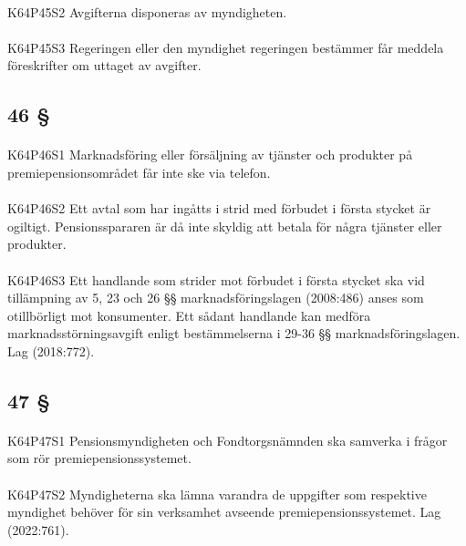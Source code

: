 \documentclass[a4paper,notitlepage,openany,10pt]{book}
\begin{document}
\paragraph*{}
{\tiny K64P45S2}
Avgifterna disponeras av myndigheten.
\paragraph*{}
{\tiny K64P45S3}
Regeringen eller den myndighet regeringen bestämmer får meddela föreskrifter om uttaget av avgifter.
\subsection*{46 §}
\paragraph*{}
{\tiny K64P46S1}
Marknadsföring eller försäljning av tjänster och produkter på premiepensionsområdet får inte ske via telefon.
\paragraph*{}
{\tiny K64P46S2}
Ett avtal som har ingåtts i strid med förbudet i första stycket är ogiltigt. Pensionsspararen är då inte skyldig att betala för några tjänster eller produkter.
\paragraph*{}
{\tiny K64P46S3}
Ett handlande som strider mot förbudet i första stycket ska vid tillämpning av 5, 23 och 26 §§ marknadsföringslagen (2008:486) anses som otillbörligt mot konsumenter. Ett sådant handlande kan medföra marknadsstörningsavgift enligt bestämmelserna i 29-36 §§ marknadsföringslagen.
Lag (2018:772).
\subsection*{47 §}
\paragraph*{}
{\tiny K64P47S1}
Pensionsmyndigheten och Fondtorgsnämnden ska samverka i frågor som rör premiepensionssystemet.
\paragraph*{}
{\tiny K64P47S2}
Myndigheterna ska lämna varandra de uppgifter som respektive myndighet behöver för sin verksamhet avseende premiepensionssystemet.
Lag (2022:761).
\end{document}
